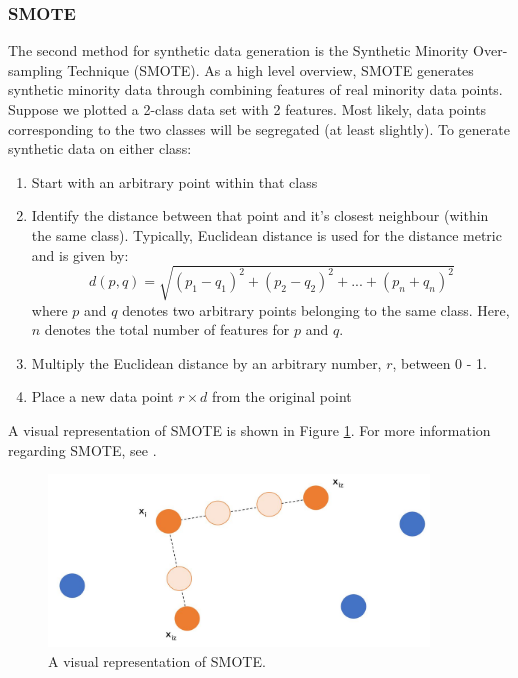 \subsubsection{SMOTE}
The second method for synthetic data generation is the Synthetic Minority Over-sampling Technique (SMOTE). As a high level overview, SMOTE generates synthetic minority data through combining features of real minority data points. Suppose we plotted a 2-class data set with 2 features.  Most likely, data points corresponding to the two classes will be segregated (at least slightly).  To generate synthetic data on either class: 
\begin{enumerate}
    \item Start with an arbitrary point within that class
    \item Identify the distance between that point and it's closest neighbour (within the same class).  Typically, Euclidean distance is used for the distance metric and is given by:
    \begin{equation}
        d(p, q) = \sqrt{(p_1 - q_1)^2 + (p_2 - q_2)^2 + ... + (p_n + q_n)^2}
    \end{equation}
    where $p$ and $q$ denotes two arbitrary points belonging to the same class.  Here, $n$ denotes the total number of features for $p$ and $q$.
    \item Multiply the Euclidean distance by an arbitrary number, $r$, between 0 - 1.
    \item Place a new data point $r \times d$ from the original point
\end{enumerate}

A visual representation of SMOTE is shown in Figure \ref{fig:03smote}. For more information regarding SMOTE, see \cite{smote}.

\begin{figure}[H]
    \centering
    \includegraphics[width=0.9\textwidth]{images/ch3/smote.jpeg}
    \caption{A visual representation of SMOTE.}
    \label{fig:03smote}
\end{figure}


